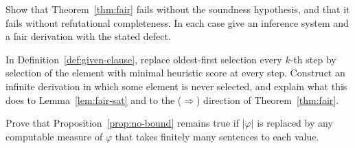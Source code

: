 \begin{exercise}
Show that Theorem~\ref{thm:fair} fails without the soundness hypothesis, and that it fails without refutational completeness. In each case give an inference system and a fair derivation with the stated defect.
\end{exercise}

\begin{exercise}
In Definition~\ref{def:given-clause}, replace oldest-first selection every $k$-th step by selection of the element with minimal heuristic score at every step. Construct an infinite derivation in which some element is never selected, and explain what this does to Lemma~\ref{lem:fair-sat} and to the ($\Rightarrow$) direction of Theorem~\ref{thm:fair}.
\end{exercise}

\begin{exercise}
Prove that Proposition~\ref{prop:no-bound} remains true if $|\varphi|$ is replaced by any computable measure of $\varphi$ that takes finitely many sentences to each value.
\end{exercise}

